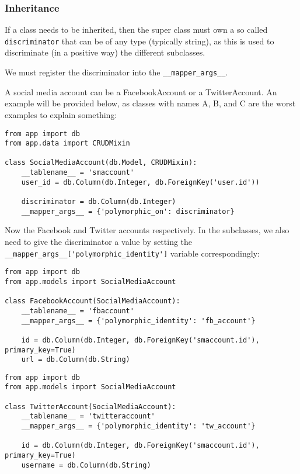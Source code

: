 \documentclass[../main/main.tex]{subfiles}
\begin{document}
\subsubsection{Inheritance}
\label{sec:inheritance}

If a class needs to be inherited, then the super class must own a so called
\lstinline|discriminator| that can be of any type (typically string), as this is
used to discriminate (in a positive way) the different subclasses. 

We must register the discriminator into the \lstinline|__mapper_args__|. 

A social media account can be a FacebookAccount or a TwitterAccount. An example
will be provided below, as classes with names A, B, and C are the worst
examples to explain something: 

\begin{lstlisting}
from app import db
from app.data import CRUDMixin

class SocialMediaAccount(db.Model, CRUDMixin):
    __tablename__ = 'smaccount'
    user_id = db.Column(db.Integer, db.ForeignKey('user.id'))

    discriminator = db.Column(db.Integer)
    __mapper_args__ = {'polymorphic_on': discriminator}  
\end{lstlisting}

Now the Facebook and Twitter accounts respectively. In the subclasses, we also
need to give the discriminator a value by setting the
\lstinline|__mapper_args__['polymorphic_identity']| variable correspondingly:

\begin{lstlisting}
from app import db
from app.models import SocialMediaAccount

class FacebookAccount(SocialMediaAccount):
    __tablename__ = 'fbaccount'
    __mapper_args__ = {'polymorphic_identity': 'fb_account'}

    id = db.Column(db.Integer, db.ForeignKey('smaccount.id'), primary_key=True)
    url = db.Column(db.String)
\end{lstlisting}

\begin{lstlisting}
from app import db
from app.models import SocialMediaAccount

class TwitterAccount(SocialMediaAccount):
    __tablename__ = 'twitteraccount'
    __mapper_args__ = {'polymorphic_identity': 'tw_account'}

    id = db.Column(db.Integer, db.ForeignKey('smaccount.id'), primary_key=True)
    username = db.Column(db.String)  
\end{lstlisting}
\end{document}
